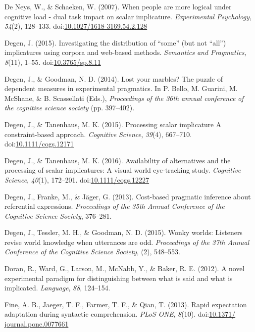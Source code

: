\documentclass[man]{apa6}
\theoremstyle{definition}
\theoremstyle{definition}
\theoremstyle{definition}
\theoremstyle{remark}
\begin{document}
\hypertarget{ref-DeNeys2007}{}
De Neys, W., \& Schaeken, W. (2007). When people are more logical under
cognitive load - dual task impact on scalar implicature.
\emph{Experimental Psychology}, \emph{54}(2), 128--133.
doi:\href{https://doi.org/10.1027/1618-3169.54.2.128}{10.1027/1618-3169.54.2.128}

\hypertarget{ref-Degen2015}{}
Degen, J. (2015). Investigating the distribution of ``some'' (but not
``all'') implicatures using corpora and web-based methods.
\emph{Semantics and Pragmatics}, \emph{8}(11), 1--55.
doi:\href{https://doi.org/10.3765/sp.8.11}{10.3765/sp.8.11}

\hypertarget{ref-Degen2014}{}
Degen, J., \& Goodman, N. D. (2014). Lost your marbles? The puzzle of
dependent measures in experimental pragmatics. In P. Bello, M. Guarini,
M. McShane, \& B. Scassellati (Eds.), \emph{Proceedings of the 36th
annual conference of the cognitive science society} (pp. 397--402).

\hypertarget{ref-DegenTanenhaus2015}{}
Degen, J., \& Tanenhaus, M. K. (2015). Processing scalar implicature A
constraint-based approach. \emph{Cognitive Science}, \emph{39}(4),
667--710.
doi:\href{https://doi.org/10.1111/cogs.12171}{10.1111/cogs.12171}

\hypertarget{ref-DegenTanenhaus2016}{}
Degen, J., \& Tanenhaus, M. K. (2016). Availability of alternatives and
the processing of scalar implicatures: A visual world eye-tracking
study. \emph{Cognitive Science}, \emph{40}(1), 172--201.
doi:\href{https://doi.org/10.1111/cogs.12227}{10.1111/cogs.12227}

\hypertarget{ref-Degen2013}{}
Degen, J., Franke, M., \& Jäger, G. (2013). Cost-based pragmatic
inference about referential expressions. \emph{Proceedings of the 35th
Annual Conference of the Cognitive Science Society}, 376--281.

\hypertarget{ref-DegenTG2015}{}
Degen, J., Tessler, M. H., \& Goodman, N. D. (2015). Wonky worlds:
Listeners revise world knowledge when utterances are odd.
\emph{Proceedings of the 37th Annual Conference of the Cognitive Science
Society}, (2), 548--553.

\hypertarget{ref-Doran2012}{}
Doran, R., Ward, G., Larson, M., McNabb, Y., \& Baker, R. E. (2012). A
novel experimental paradigm for distinguishing between what is said and
what is implicated. \emph{Language}, \emph{88}, 124--154.

\hypertarget{ref-Fine2013}{}
Fine, A. B., Jaeger, T. F., Farmer, T. F., \& Qian, T. (2013). Rapid
expectation adaptation during syntactic comprehension. \emph{PLoS ONE},
\emph{8}(10).
doi:\href{https://doi.org/10.1371/\%20journal.pone.0077661}{10.1371/ journal.pone.0077661}
\end{document}
